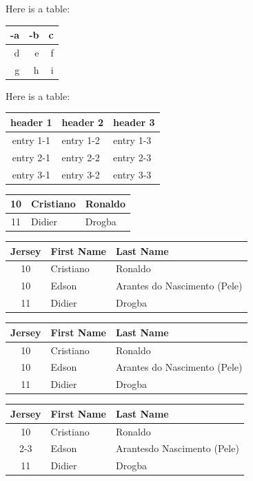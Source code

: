 \documentclass[11pt]{article}
\begin{document}
Here is a table:
\begin{tabular}{r||r|r}
-a & -b & c \\
\hline\hline
d & e & f \\
\hline
g & h & i
\end{tabular}

Here is a table:
\begin{tabular}{c||l|l}
header 1 & header 2 & header 3 \\
\hline\hline
entry 1-1 & entry 1-2 & entry 1-3 \\
\hline
entry 2-1 & entry 2-2 & entry 2-3 \\
\hline
entry 3-1 & entry 3-2 & entry 3-3
\end{tabular}

\begin{center}
\begin{tabular}{c||l|l}
\hline\hline
10 & Cristiano & Ronaldo \\
\hline
11 & Didier & Drogba
\end{tabular}
\end{center}

\begin{center}
\begin{tabular}{c||l|l}
Jersey & First Name & Last Name \\
\hline\hline
10 & Cristiano & Ronaldo \\
\hline
10 & Edson & Arantes do Nascimento (Pele)\\
\hline
11 & Didier & Drogba
\end{tabular}
\end{center}


\begin{center}
\begin{tabular}{c||l|p{1in}}
Jersey & First Name & Last Name \\
\hline\hline
10 & Cristiano & Ronaldo \\
\hline
10 & Edson & Arantes \newline do Nascimento (Pele)\\
\hline
11 & Didier & Drogba
\end{tabular}
\end{center}

\begin{center}
\begin{tabular}{c||l|p{1in}}
Jersey & First Name & Last Name \\
\hline\hline
10 & Cristiano & Ronaldo \\
\cline{2-3}
& Edson & Arantes\newline do Nascimento (Pele)\\
\hline
11 & Didier & Drogba
\end{tabular}
\end{center}
\end{document}
